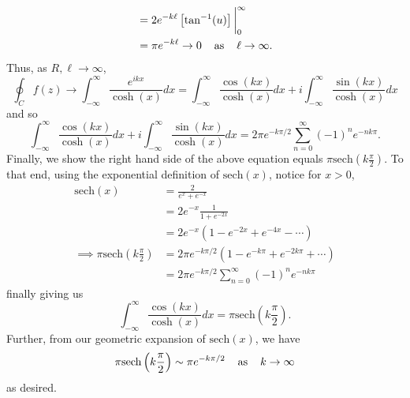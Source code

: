 \documentclass{article}
\begin{document}
\begin{itemize}
\begin{itemize}
\begin{align*}
            &= 2e^{-k\ell}\left[\tan^{-1}(u)\right]\bigg|_0^{\infty}\\
            &= \pi e^{-k\ell} \to 0 \hspace{0.4cm} \text{as} \hspace{0.4cm} \ell \to \infty.
        \end{align*}
        Thus, as $R, \ell \to \infty$,
        \[\oint_Cf(z) \to \int_{-\infty}^{\infty} \frac{e^{ikx}}{\cosh(x)}dx = \int_{-\infty}^{\infty} \frac{\cos(kx)}{\cosh(x)}dx + i\int_{-\infty}^{\infty}\frac{\sin(kx)}{\cosh(x)}dx\]
        and so
        \[\int_{-\infty}^{\infty}\frac{\cos(kx)}{\cosh(x)}dx + i\int_{-\infty}^{\infty}\frac{\sin(kx)}{\cosh(x)}dx = 2\pi e^{-k\pi/2}\sum_{n = 0}^{\infty} (-1)^ne^{-nk\pi}.\]
        Finally, we show the right hand side of the above equation equals $\pi\text{sech}\left(k\frac{\pi}{2}\right)$.
        To that end, using the exponential definition of $\text{sech}(x)$, notice for $x > 0$,
        \begin{align*}
            \text{sech}(x) &= \frac{2}{e^x + e^{-x}}\\
            &= 2e^{-x} \frac{1}{1 + e^{-2x}}\\
            &= 2e^{-x}(1 - e^{-2x} + e^{-4x} - \cdots)\\
            \implies \pi\text{sech}\left(k\frac{\pi}{2}\right) &= 2\pi e^{-k\pi/2}(1 - e^{-k\pi} + e^{-2k\pi} + \cdots)\\
            &= 2\pi e^{-k\pi/2}\sum_{n = 0}^{\infty}(-1)^ne^{-nk\pi}
        \end{align*}
        finally giving us
        \[\int_{-\infty}^{\infty}\frac{\cos(kx)}{\cosh(x)}dx = \pi\text{sech}\left(k\frac{\pi}{2}\right).\]
        Further, from our geometric expansion of $\text{sech}(x)$, we have
        \[\pi\text{sech}\left(k\frac{\pi}{2}\right) \sim \pi e^{-k\pi/2} \hspace{0.4cm} \text{as} \hspace{0.4cm} k \to \infty\]
        as desired.
    \end{itemize}
    
\end{itemize}
\end{document}
